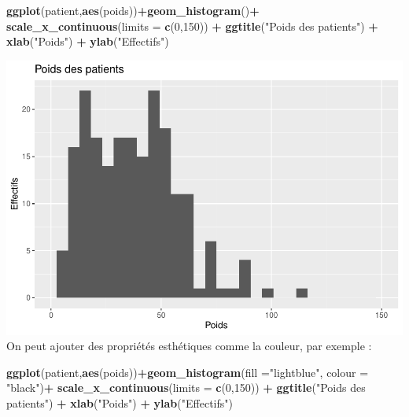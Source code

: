 \documentclass[
]{book}
\newenvironment{Shaded}{\begin{snugshade}}{\end{snugshade}}
\newcommand{\AttributeTok}[1]{\textcolor[rgb]{0.13,0.29,0.53}{#1}}
\newcommand{\DecValTok}[1]{\textcolor[rgb]{0.00,0.00,0.81}{#1}}
\newcommand{\FunctionTok}[1]{\textcolor[rgb]{0.13,0.29,0.53}{\textbf{#1}}}
\newcommand{\NormalTok}[1]{#1}
\newcommand{\SpecialCharTok}[1]{\textcolor[rgb]{0.81,0.36,0.00}{\textbf{#1}}}
\newcommand{\StringTok}[1]{\textcolor[rgb]{0.31,0.60,0.02}{#1}}
\begin{document}
\begin{Shaded}
\begin{Highlighting}[]
\FunctionTok{ggplot}\NormalTok{(patient,}\FunctionTok{aes}\NormalTok{(poids))}\SpecialCharTok{+}\FunctionTok{geom\_histogram}\NormalTok{()}\SpecialCharTok{+}
  \FunctionTok{scale\_x\_continuous}\NormalTok{(}\AttributeTok{limits =} \FunctionTok{c}\NormalTok{(}\DecValTok{0}\NormalTok{,}\DecValTok{150}\NormalTok{)) }\SpecialCharTok{+} 
  \FunctionTok{ggtitle}\NormalTok{(}\StringTok{"Poids des patients"}\NormalTok{) }\SpecialCharTok{+} 
  \FunctionTok{xlab}\NormalTok{(}\StringTok{"Poids"}\NormalTok{) }\SpecialCharTok{+} 
  \FunctionTok{ylab}\NormalTok{(}\StringTok{"Effectifs"}\NormalTok{)}
\end{Highlighting}
\end{Shaded}

\includegraphics{_main_files/figure-latex/ggplot6-1.pdf}
On peut ajouter des propriétés esthétiques comme la couleur, par exemple :

\begin{Shaded}
\begin{Highlighting}[]
\FunctionTok{ggplot}\NormalTok{(patient,}\FunctionTok{aes}\NormalTok{(poids))}\SpecialCharTok{+}\FunctionTok{geom\_histogram}\NormalTok{(}\AttributeTok{fill =}\StringTok{"lightblue"}\NormalTok{, }\AttributeTok{colour =} \StringTok{"black"}\NormalTok{)}\SpecialCharTok{+}
  \FunctionTok{scale\_x\_continuous}\NormalTok{(}\AttributeTok{limits =} \FunctionTok{c}\NormalTok{(}\DecValTok{0}\NormalTok{,}\DecValTok{150}\NormalTok{)) }\SpecialCharTok{+} 
  \FunctionTok{ggtitle}\NormalTok{(}\StringTok{"Poids des patients"}\NormalTok{) }\SpecialCharTok{+} 
  \FunctionTok{xlab}\NormalTok{(}\StringTok{"Poids"}\NormalTok{) }\SpecialCharTok{+} 
  \FunctionTok{ylab}\NormalTok{(}\StringTok{"Effectifs"}\NormalTok{)}
\end{Highlighting}
\end{Shaded}
\end{document}

